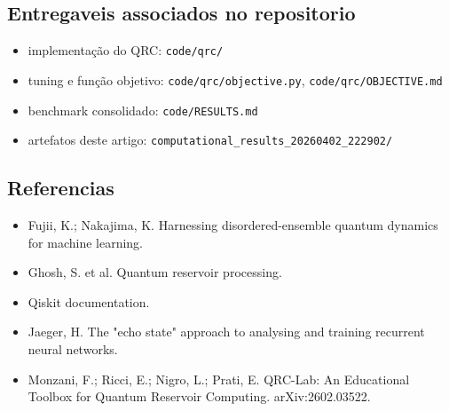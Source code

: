 \documentclass[12pt]{article}
\providecommand{\tightlist}{%
  \setlength{\itemsep}{0pt}\setlength{\parskip}{0pt}}
\begin{document}
\subsection{Entregaveis associados no repositorio}\label{entregaveis-associados-no-repositorio}

\begin{itemize}
\tightlist
\item
  implementação do QRC: \texttt{code/qrc/}
\item
  tuning e função objetivo: \texttt{code/qrc/objective.py}, \texttt{code/qrc/OBJECTIVE.md}
\item
  benchmark consolidado: \texttt{code/RESULTS.md}
\item
  artefatos deste artigo: \texttt{computational\_results\_20260402\_222902/}
\end{itemize}

\subsection{Referencias}\label{referencias}

\begin{itemize}
\tightlist
\item
  Fujii, K.; Nakajima, K. Harnessing disordered-ensemble quantum dynamics for machine learning.
\item
  Ghosh, S. et al. Quantum reservoir processing.
\item
  Qiskit documentation.
\item
  Jaeger, H. The "echo state" approach to analysing and training recurrent neural networks.
\item
  Monzani, F.; Ricci, E.; Nigro, L.; Prati, E. QRC-Lab: An Educational Toolbox for Quantum Reservoir Computing. arXiv:2602.03522.
\end{itemize}
\end{document}
